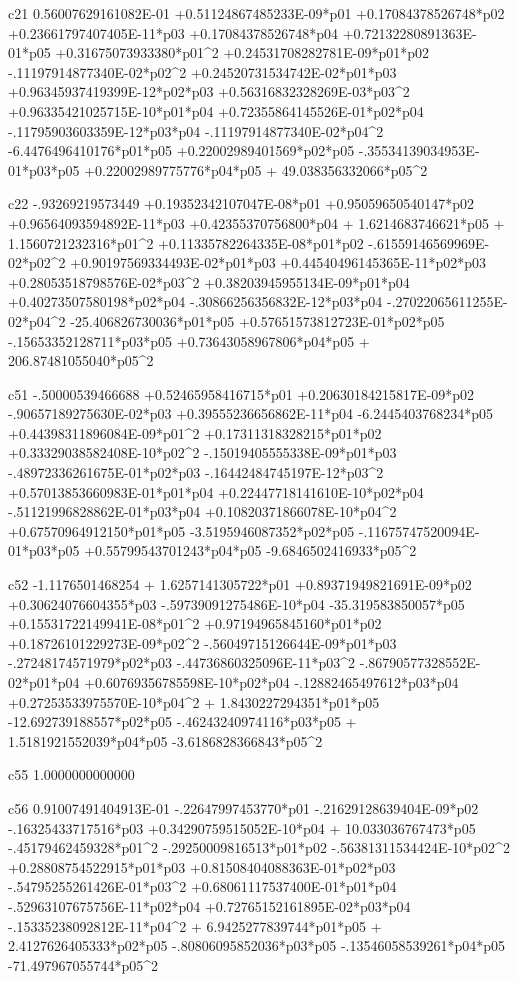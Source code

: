  c21
  0.56007629161082E-01 +0.51124867485233E-09*p01 +0.17084378526748*p02 +0.23661797407405E-11*p03 +0.17084378526748*p04 +0.72132280891363E-01*p05 +0.31675073933380*p01^2 +0.24531708282781E-09*p01*p02  -.11197914877340E-02*p02^2 +0.24520731534742E-02*p01*p03 +0.96345937419399E-12*p02*p03 +0.56316832328269E-03*p03^2 +0.96335421025715E-10*p01*p04 +0.72355864145526E-01*p02*p04  -.11795903603359E-12*p03*p04  -.11197914877340E-02*p04^2  -6.4476496410176*p01*p05 +0.22002989401569*p02*p05  -.35534139034953E-01*p03*p05 +0.22002989775776*p04*p05 + 49.038356332066*p05^2 
  
 c22
  -.93269219573449 +0.19352342107047E-08*p01 +0.95059650540147*p02 +0.96564093594892E-11*p03 +0.42355370756800*p04 + 1.6214683746621*p05 + 1.1560721232316*p01^2 +0.11335782264335E-08*p01*p02  -.61559146569969E-02*p02^2 +0.90197569334493E-02*p01*p03 +0.44540496145365E-11*p02*p03 +0.28053518798576E-02*p03^2 +0.38203945955134E-09*p01*p04 +0.40273507580198*p02*p04  -.30866256356832E-12*p03*p04  -.27022065611255E-02*p04^2  -25.406826730036*p01*p05 +0.57651573812723E-01*p02*p05  -.15653352128711*p03*p05 +0.73643058967806*p04*p05 + 206.87481055040*p05^2 
  
 c51
  -.50000539466688 +0.52465958416715*p01 +0.20630184215817E-09*p02  -.90657189275630E-02*p03 +0.39555236656862E-11*p04  -6.2445403768234*p05 +0.44398311896084E-09*p01^2 +0.17311318328215*p01*p02 +0.33329038582408E-10*p02^2  -.15019405555338E-09*p01*p03  -.48972336261675E-01*p02*p03  -.16442484745197E-12*p03^2 +0.57013853660983E-01*p01*p04 +0.22447718141610E-10*p02*p04  -.51121996828862E-01*p03*p04 +0.10820371866078E-10*p04^2 +0.67570964912150*p01*p05  -3.5195946087352*p02*p05  -.11675747520094E-01*p03*p05 +0.55799543701243*p04*p05  -9.6846502416933*p05^2 
  
 c52
  -1.1176501468254 + 1.6257141305722*p01 +0.89371949821691E-09*p02 +0.30624076604355*p03  -.59739091275486E-10*p04  -35.319583850057*p05 +0.15531722149941E-08*p01^2 +0.97194965845160*p01*p02 +0.18726101229273E-09*p02^2  -.56049715126644E-09*p01*p03  -.27248174571979*p02*p03  -.44736860325096E-11*p03^2  -.86790577328552E-02*p01*p04 +0.60769356785598E-10*p02*p04  -.12882465497612*p03*p04 +0.27253533975570E-10*p04^2 + 1.8430227294351*p01*p05  -12.692739188557*p02*p05  -.46243240974116*p03*p05 + 1.5181921552039*p04*p05  -3.6186828366843*p05^2 
  
 c55
   1.0000000000000 
  
 c56
  0.91007491404913E-01  -.22647997453770*p01  -.21629128639404E-09*p02  -.16325433717516*p03 +0.34290759515052E-10*p04 + 10.033036767473*p05  -.45179462459328*p01^2  -.29250009816513*p01*p02  -.56381311534424E-10*p02^2 +0.28808754522915*p01*p03 +0.81508404088363E-01*p02*p03  -.54795255261426E-01*p03^2 +0.68061117537400E-01*p01*p04  -.52963107675756E-11*p02*p04 +0.72765152161895E-02*p03*p04  -.15335238092812E-11*p04^2 + 6.9425277839744*p01*p05 + 2.4127626405333*p02*p05  -.80806095852036*p03*p05  -.13546058539261*p04*p05  -71.497967055744*p05^2 
  
